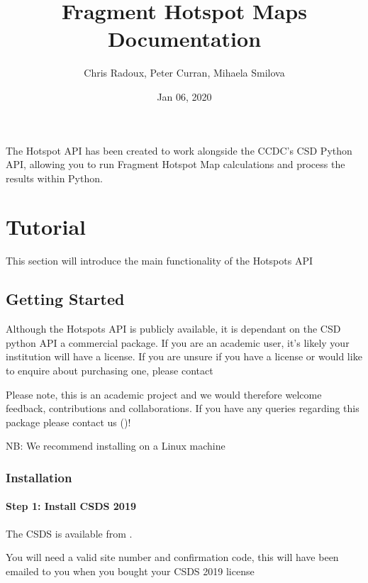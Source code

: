 \documentclass[letterpaper,10pt,english]{sphinxmanual}
\title{Fragment Hotspot Maps Documentation}
\date{Jan 06, 2020}
\author{Chris Radoux, Peter Curran, Mihaela Smilova}
\begin{document}
\pagestyle{empty}
\sphinxmaketitle
\pagestyle{plain}
\sphinxtableofcontents
\pagestyle{normal}
\label{\detokenize{index::doc}}


\noindent{}

The Hotspot API has been created to work alongside the CCDC’s CSD Python API, allowing you to run Fragment Hotspot Map
calculations and process the results within Python.


\chapter{Tutorial}
\label{\detokenize{tutorial:tutorial}}\label{\detokenize{tutorial::doc}}
This section will introduce the main functionality of the Hotspots API


\section{Getting Started}
\label{\detokenize{tutorial:getting-started}}
Although the Hotspots API is publicly available, it is dependant on the CSD python API \sphinxhyphen{} a commercial package.
If you are an academic user, it’s likely your institution will have a license. If you are unsure if you have a
license or would like to enquire about purchasing one, please contact 

Please note, this is an academic project and we would therefore welcome feedback, contributions and collaborations.
If you have any queries regarding this package please contact us ()!

NB: We recommend installing on a Linux machine


\subsection{Installation}
\label{\detokenize{tutorial:installation}}

\subsubsection{Step 1: Install CSDS 2019}
\label{\detokenize{tutorial:step-1-install-csds-2019}}
The CSDS is available from .

You will need a valid site number and confirmation code, this will have been emailed to you when you bought your CSDS 2019 license
\end{document}
